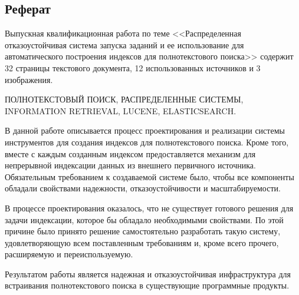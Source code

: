 \begin{center}
	\section*{Реферат}
\end{center}

Выпускная квалификационная работа по теме <<Распределенная отказоустойчивая система запуска заданий и ее использование для автоматического построения индексов для полнотекстового поиска>> содержит 32 страницы текстового документа, 12 использованных источников и 3 изображения.

ПОЛНОТЕКСТОВЫЙ ПОИСК, РАСПРЕДЕЛЕННЫЕ СИСТЕМЫ, INFORMATION RETRIEVAL, LUCENE, ELASTICSEARCH.

В данной работе описывается процесс проектирования и реализации системы инструментов для создания индексов  для полнотекстового поиска. Кроме того, вместе с каждым созданным индексом предоставляется механизм для непрерывной индексации данных из внешнего первичного источника. Обязательным требованием к создаваемой системе было, чтобы все компоненты обладали свойствами надежности, отказоустойчивости и масштабируемости.

В процессе проектирования оказалось, что не существует готового решения для задачи индексации, которое бы обладало необходимыми свойствами. По этой причине было принято решение самостоятельно разработать такую систему, удовлетворяющую всем поставленным требованиям и, кроме всего прочего, расширяемую и переиспользуемую.

Результатом работы является надежная и отказоустойчивая инфраструктура для встраивания полнотекстового поиска в существующие программные продукты.


\clearpage
